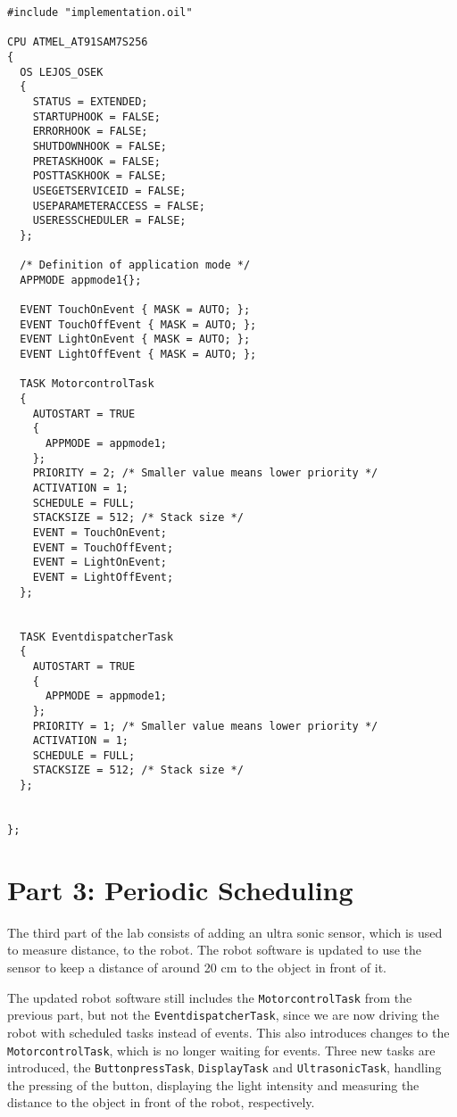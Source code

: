 \documentclass[a4paper,10pt]{report}
\begin{document}
\begin{lstlisting}[label=some-code,caption=part2.oil,mathescape]
#include "implementation.oil"

CPU ATMEL_AT91SAM7S256
{
  OS LEJOS_OSEK
  {
    STATUS = EXTENDED;
    STARTUPHOOK = FALSE;
    ERRORHOOK = FALSE;
    SHUTDOWNHOOK = FALSE;
    PRETASKHOOK = FALSE;
    POSTTASKHOOK = FALSE;
    USEGETSERVICEID = FALSE;
    USEPARAMETERACCESS = FALSE;
    USERESSCHEDULER = FALSE;
  };

  /* Definition of application mode */
  APPMODE appmode1{};

  EVENT TouchOnEvent { MASK = AUTO; };
  EVENT TouchOffEvent { MASK = AUTO; };
  EVENT LightOnEvent { MASK = AUTO; };	
  EVENT LightOffEvent { MASK = AUTO; };

  TASK MotorcontrolTask
  {
    AUTOSTART = TRUE
    {
      APPMODE = appmode1;
    };
    PRIORITY = 2; /* Smaller value means lower priority */
    ACTIVATION = 1;
    SCHEDULE = FULL;
    STACKSIZE = 512; /* Stack size */
    EVENT = TouchOnEvent;
    EVENT = TouchOffEvent;
    EVENT = LightOnEvent;
    EVENT = LightOffEvent;
  };


  TASK EventdispatcherTask 
  {
    AUTOSTART = TRUE
    {
      APPMODE = appmode1;
    };
    PRIORITY = 1; /* Smaller value means lower priority */
    ACTIVATION = 1;
    SCHEDULE = FULL;
    STACKSIZE = 512; /* Stack size */
  };


};
\end{lstlisting}
\newpage

\section*{Part 3: Periodic Scheduling}

The third part of the lab consists of adding an ultra sonic sensor, which is used to measure distance, to the robot. The robot software is updated to use the sensor to keep a distance of around 20 cm to the object in front of it.

The updated robot software still includes the \texttt{MotorcontrolTask} from the previous part, but not the \texttt{EventdispatcherTask}, since we are now driving the robot with scheduled tasks instead of events. This also introduces changes to the \texttt{MotorcontrolTask}, which is no longer waiting for events. Three new tasks are introduced, the \texttt{ButtonpressTask}, \texttt{DisplayTask} and \texttt{UltrasonicTask}, handling the pressing of the button, displaying the light intensity and measuring the distance to the object in front of the robot, respectively.
\end{document}
